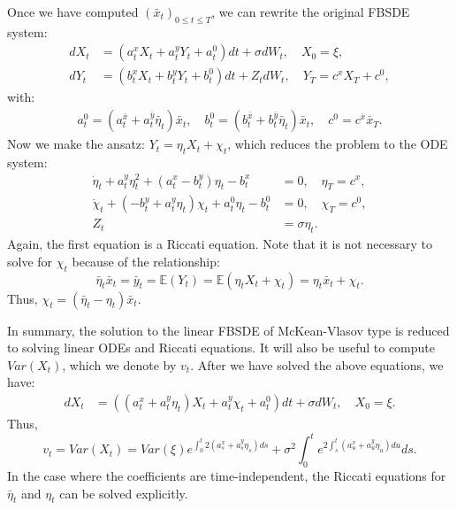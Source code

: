 \documentclass[11pt]{article}
\begin{document}
\begin{appendices}
Once we have computed $(\bar{x}_t)_{0\leq t\leq T}$, we can rewrite the original FBSDE system:
\begin{equation*}
\begin{split}
        dX_t&=\left(a^x_tX_t+a^y_tY_t+a^0_t\right)dt+\sigma dW_t, \quad X_0=\xi, \\
        dY_t&=\left(b^x_tX_t+b^y_tY_t+b^0_t\right)dt +Z_t dW_t, \quad Y_T=c^xX_T+c^0,
\end{split}
\end{equation*}
with:
\begin{equation*}
\begin{split}
    a^0_t=(a^{\bar{x}}_t+a^{\bar{y}}_t \bar{\eta}_t)\bar{x}_t, \quad b^0_t=(b^{\bar{x}}_t+b^{\bar{y}}_t \bar{\eta}_t)\bar{x}_t, \quad c^0=c^{\bar{x}}\bar{x}_T.
\end{split}
\end{equation*}
Now we make the ansatz: $Y_t=\eta_t X_t+\chi_t$, which reduces the problem to the ODE system:
\begin{equation*}
\begin{split}
    \dot{\eta}_t+a^y_t\eta_t^2+(a^x_t-b^y_t)\eta_t-b^x_t&=0, \quad \eta_T=c^x, \\
    \dot{\chi}_t+(-b^y_t+a^y_t\eta_t)\chi_t+a^0_t\eta_t-b^0_t&=0, \quad \chi_T=c^0, \\
    Z_t&=\sigma \eta_t.
\end{split}
\end{equation*}
Again, the first equation is a Riccati equation. Note that it is not necessary to solve for $\chi_t$ because of the relationship:
\begin{equation*}
    \bar{\eta}_t\bar{x}_t=\bar{y}_t=\mathbb{E}(Y_t)=\mathbb{E}(\eta_t X_t+\chi_t)=\eta_t \bar{x}_t+\chi_t.
\end{equation*}
Thus,
$\chi_t=(\bar{\eta}_t-\eta_t)\bar{x}_t.$

In summary, the solution to the linear FBSDE of McKean-Vlasov type is reduced to solving linear ODEs and Riccati equations. It will also be useful to compute $Var(X_t)$, which we denote by $v_t$. After we have solved the above equations, we have:
\begin{equation*}
\begin{split}
        dX_t&=\left((a^x_t+a^y_t \eta_t)X_t+a^y_t \chi_t+a^0_t\right)dt+\sigma dW_t, \quad X_0=\xi.
\end{split}
\end{equation*}
Thus,
\begin{equation*}
    v_t=Var(X_t)=Var(\xi)e^{\int_0^t 2(a^x_s+a^y_s\eta_s)ds}+\sigma^2 \int_0^t e^{2 \int_s^t (a^x_u+a^y_u\eta_u) du}ds.
\end{equation*}
In the case where the coefficients are time-independent, the Riccati equations for $\bar{\eta}_t$ and $\eta_t$ can be solved explicitly.


\end{appendices}
\end{document}
